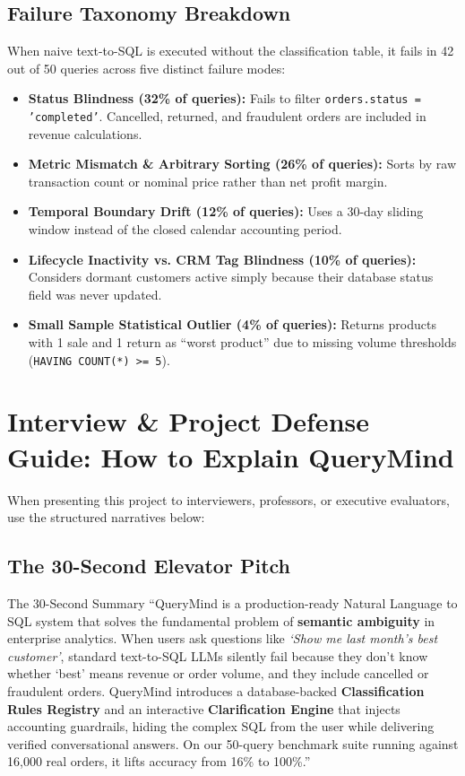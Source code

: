 \documentclass[10pt,a4paper]{article}
\begin{document}
\subsection{Failure Taxonomy Breakdown}
When naive text-to-SQL is executed without the classification table, it fails in 42 out of 50 queries across five distinct failure modes:
\begin{itemize}[leftmargin=*]
    \item \textbf{Status Blindness (32\% of queries):} Fails to filter \texttt{orders.status = 'completed'}. Cancelled, returned, and fraudulent orders are included in revenue calculations.
    \item \textbf{Metric Mismatch \& Arbitrary Sorting (26\% of queries):} Sorts by raw transaction count or nominal price rather than net profit margin.
    \item \textbf{Temporal Boundary Drift (12\% of queries):} Uses a 30-day sliding window instead of the closed calendar accounting period.
    \item \textbf{Lifecycle Inactivity vs. CRM Tag Blindness (10\% of queries):} Considers dormant customers active simply because their database status field was never updated.
    \item \textbf{Small Sample Statistical Outlier (4\% of queries):} Returns products with 1 sale and 1 return as ``worst product'' due to missing volume thresholds (\texttt{HAVING COUNT(*) >= 5}).
\end{itemize}

\newpage
\section{Interview \& Project Defense Guide: How to Explain QueryMind}

When presenting this project to interviewers, professors, or executive evaluators, use the structured narratives below:

\subsection{The 30-Second Elevator Pitch}
\begin{calloutbox}{The 30-Second Summary}
``QueryMind is a production-ready Natural Language to SQL system that solves the fundamental problem of \textbf{semantic ambiguity} in enterprise analytics. When users ask questions like \textit{`Show me last month's best customer'}, standard text-to-SQL LLMs silently fail because they don't know whether `best' means revenue or order volume, and they include cancelled or fraudulent orders. QueryMind introduces a database-backed \textbf{Classification Rules Registry} and an interactive \textbf{Clarification Engine} that injects accounting guardrails, hiding the complex SQL from the user while delivering verified conversational answers. On our 50-query benchmark suite running against 16,000 real orders, it lifts accuracy from 16\% to 100\%.''
\end{calloutbox}
\end{document}
